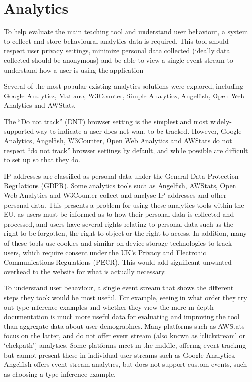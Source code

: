 \documentclass[a4paper,fleqn,twoside,12pt]{report}
\begin{document}
\section{Analytics}\label{id:h.60njhv340fb0}
To help evaluate the main teaching tool and understand user behaviour, a system to collect and store behavioural analytics data is required. This tool should respect user privacy settings, minimize personal data collected (ideally data collected should be anonymous) and be able to view a single event stream to understand how a user is using the application.

Several of the most popular existing analytics solutions were explored, including Google Analytics, Matomo, W3Counter, Simple Analytics, Angelfish, Open Web Analytics and AWStats.

The “Do not track” (DNT) browser setting is the simplest and most widely-supported way to indicate a user does not want to be tracked. However, Google Analytics, Angelfish, W3Counter, Open Web Analytics and AWStats do not respect “do not track” browser settings by default, and while possible are difficult to set up so that they do.

IP addresses are classified as personal data under the General Data Protection Regulations (GDPR). Some analytics tools such as Angelfish, AWStats, Open Web Analytics and W3Counter collect and analyse IP addresses and other personal data. This presents a problem for using these analytics tools within the EU, as users must be informed as to how their personal data is collected and processed, and users have several rights relating to personal data such as the right to be forgotten, the right to object or the right to access. In addition, many of these tools use cookies and similar on-device storage technologies to track users, which require consent under the UK’s Privacy and Electronic Communications Regulations (PECR). This would add significant unwanted overhead to the website for what is actually necessary.

To understand user behaviour, a single event stream that shows the different steps they took would be most useful. For example, seeing in what order they try out type inference examples and whether they view the more in depth documentation is much more useful data for evaluating and improving the tool than aggregate data about user demographics. Many platforms such as AWStats focus on the latter, and do not offer event stream (also known as ‘clickstream’ or ‘clickpath’) analytics. Some platforms meet in the middle, offering event tracking but cannot present these in individual user streams such as Google Analytics. Angelfish offers event stream analytics, but does not support custom events, such as choosing a type inference example.
\end{document}
